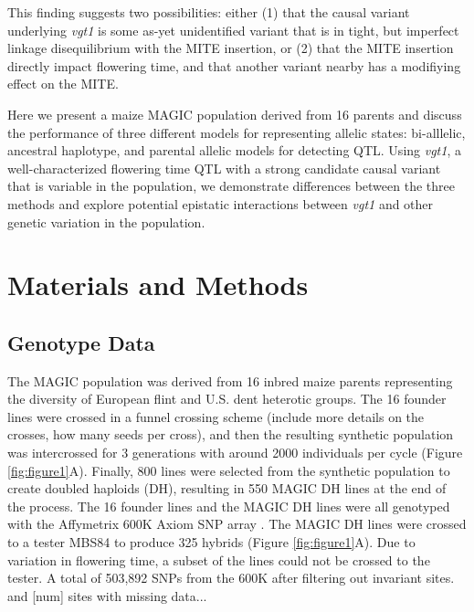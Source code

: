 \documentclass[article,9pt,twocolumn,twoside]{rilabRxiv}
\begin{document}
This finding suggests two possibilities: either (1) that the causal variant underlying \emph{vgt1} is some as-yet unidentified variant that is in tight, but imperfect linkage disequilibrium with the MITE insertion, or (2) that the MITE insertion directly impact flowering time, and that another variant nearby has a modifiying effect on the MITE.

Here we present a maize MAGIC population derived from 16 parents and discuss the performance of three different models for representing allelic states: bi-alllelic, ancestral haplotype, and parental allelic models for detecting QTL.
Using \emph{vgt1}, a well-characterized flowering time QTL with a strong candidate causal variant that is variable in the population, we demonstrate differences between the three methods and explore potential epistatic interactions between \emph{vgt1} and other genetic variation in the population.

\section{Materials and Methods}
\label{sec:materials:methods}
\subsection{Genotype Data}
The MAGIC population was derived from 16 inbred maize parents representing the diversity of European flint and U.S. dent heterotic groups.
The 16 founder lines were crossed in a funnel crossing scheme (include more details on the crosses, how many seeds per cross), and then the resulting synthetic population was intercrossed for 3 generations with around 2000 individuals per cycle (Figure \ref{fig:figure1}A).
Finally, 800 lines were selected from the synthetic population to create doubled haploids (DH), resulting in 550 MAGIC DH lines at the end of the process. The 16 founder lines and the MAGIC DH lines were all genotyped with the Affymetrix 600K Axiom SNP array \citep{Unterseer}.
The MAGIC DH lines were crossed to a tester MBS84 to produce 325 hybrids (Figure \ref{fig:figure1}A).
Due to variation in flowering time, a subset of the lines could not be crossed to the tester.
A total of 503,892 SNPs from the  600K after filtering out invariant sites.
and [num] sites with missing data...
\end{document}
